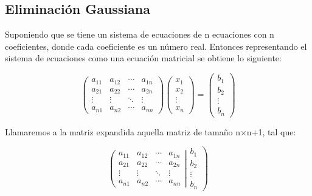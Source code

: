 \subsection{Eliminación Gaussiana}

Suponiendo que se tiene un sistema de ecuaciones de  n ecuaciones con n coeficientes, donde cada coeficiente es un número real. Entonces representando el sistema de ecuaciones como una ecuación matricial se obtiene lo siguiente:

\begin{equation*}
    \begin{pmatrix}
        a_{11} & a_{12} & \cdots & a_{1n} \\
        a_{21} & a_{22} & \cdots & a_{2n} \\
        \vdots & \vdots & \ddots & \vdots \\
        a_{n1} & a_{n2} & \cdots & a_{nn}
    \end{pmatrix}
    \begin{pmatrix}
        x_1    \\
        x_2    \\
        \vdots \\
        x_n
    \end{pmatrix} =
    \begin{pmatrix}
        b_1    \\
        b_2    \\
        \vdots \\
        b_n
    \end{pmatrix}
\end{equation*}

Llamaremos a la matriz expandida aquella matriz de tamaño n$\times$n+1, tal que:

\begin{equation}
    \left(\begin{matrix}
            a_{11} & a_{12} & \cdots & a_{1n} \\
            a_{21} & a_{22} & \cdots & a_{2n} \\
            \vdots & \vdots & \ddots & \vdots \\
            a_{n1} & a_{n2} & \cdots & a_{nn}
        \end{matrix}\right| \left.
    \begin{matrix}
            b_1    \\
            b_2    \\
            \vdots \\
            b_n
        \end{matrix}
    \right)
    \label{eq:extended_matrix}
\end{equation}

